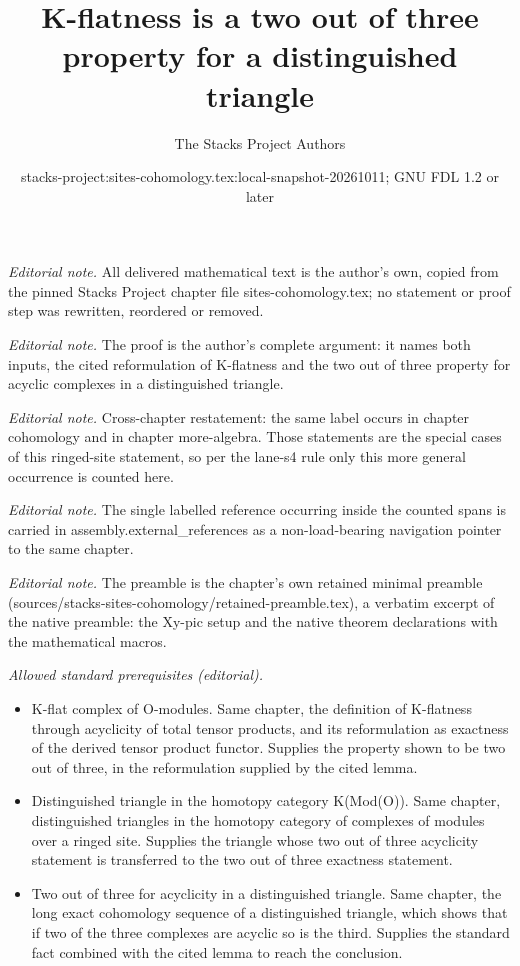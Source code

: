 \documentclass[10pt,a4paper]{amsart}
\title{K-flatness is a two out of three property for a distinguished triangle}
\author{The Stacks Project Authors}
\date{stacks-project:sites-cohomology.tex:local-snapshot-20261011; GNU FDL 1.2 or later}
\theoremstyle{plain}
\theoremstyle{definition}
\theoremstyle{remark}
\numberwithin{equation}{subsection}
\begin{document}
\maketitle
\noindent\textit{Editorial note.} All delivered mathematical text is the author's own, copied from the pinned Stacks Project chapter file sites-cohomology.tex; no statement or proof step was rewritten, reordered or removed.\par\medskip
\noindent\textit{Editorial note.} The proof is the author's complete argument: it names both inputs, the cited reformulation of K-flatness and the two out of three property for acyclic complexes in a distinguished triangle.\par\medskip
\noindent\textit{Editorial note.} Cross-chapter restatement: the same label occurs in chapter cohomology and in chapter more-algebra. Those statements are the special cases of this ringed-site statement, so per the lane-s4 rule only this more general occurrence is counted here.\par\medskip
\noindent\textit{Editorial note.} The single labelled reference occurring inside the counted spans is carried in assembly.external\_references as a non-load-bearing navigation pointer to the same chapter.\par\medskip
\noindent\textit{Editorial note.} The preamble is the chapter's own retained minimal preamble (sources/stacks-sites-cohomology/retained-preamble.tex), a verbatim excerpt of the native preamble: the Xy-pic setup and the native theorem declarations with the mathematical macros.\par\medskip
\noindent\textit{Allowed standard prerequisites (editorial).}\begin{itemize}
\item K-flat complex of O-modules. Same chapter, the definition of K-flatness through acyclicity of total tensor products, and its reformulation as exactness of the derived tensor product functor. Supplies the property shown to be two out of three, in the reformulation supplied by the cited lemma.
\item Distinguished triangle in the homotopy category K(Mod(O)). Same chapter, distinguished triangles in the homotopy category of complexes of modules over a ringed site. Supplies the triangle whose two out of three acyclicity statement is transferred to the two out of three exactness statement.
\item Two out of three for acyclicity in a distinguished triangle. Same chapter, the long exact cohomology sequence of a distinguished triangle, which shows that if two of the three complexes are acyclic so is the third. Supplies the standard fact combined with the cited lemma to reach the conclusion.
\end{itemize}\medskip
\end{document}
